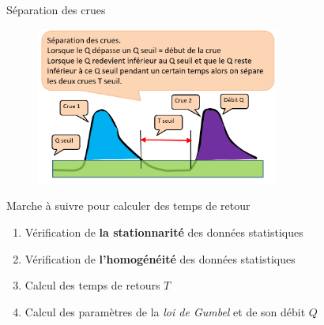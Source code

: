 \documentclass{beamer}
\begin{document}
\begin{frame}{Séparation des crues}
    \begin{figure}
        \centering
        \includegraphics[width=8cm]{separationCrue.png}
    \end{figure}
\end{frame}

\begin{frame}{Marche à suivre pour calculer des temps de retour}
    \begin{enumerate}
        \item Vérification de \textbf{la stationnarité} des données statistiques
        \item Vérification de \textbf{l'homogénéité} des données statistiques
        \item Calcul des temps de retours $T$
        \item Calcul des paramètres de la \textit{loi de Gumbel} et de son débit $Q$
    \end{enumerate}
\end{frame}
\end{document}
